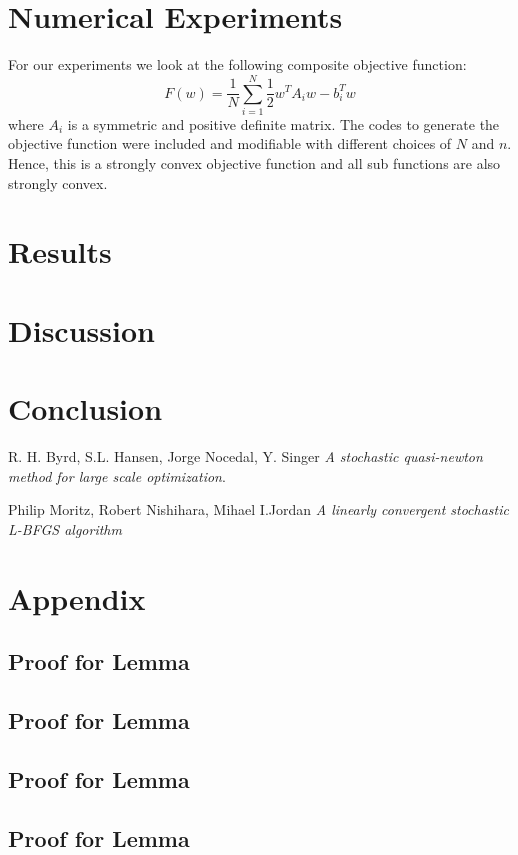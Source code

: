 \documentclass[journal,onecolumn]{IEEEtran}
\begin{document}
\section{Numerical Experiments}
For our experiments we look at the following composite objective function:
\begin{equation*}
F(w) = \frac{1}{N}\underset{i=1}{\overset{N}{\sum}}\frac{1}{2}w^TA_iw-b_i^Tw
\end{equation*}
where $ A_i $ is a symmetric and positive definite matrix. The codes to generate the objective function were included and modifiable with different choices of $ N $ and $ n $. Hence, this is a strongly convex objective function and all sub functions are also strongly convex.

\section{Results}


\section{Discussion}


\section{Conclusion}


\begin{thebibliography}{}
	R. H. Byrd, S.L. Hansen, Jorge Nocedal, Y. Singer 
	\textit{A stochastic quasi-newton method for large scale optimization}. 
	
	Philip Moritz, Robert Nishihara, Mihael I.Jordan 
	\textit{A linearly convergent stochastic L-BFGS algorithm}
\end{thebibliography}

\section{Appendix}
\subsection{Proof for Lemma}

\subsection{Proof for Lemma}

\subsection{Proof for Lemma}

\subsection{Proof for Lemma}
\end{document}
